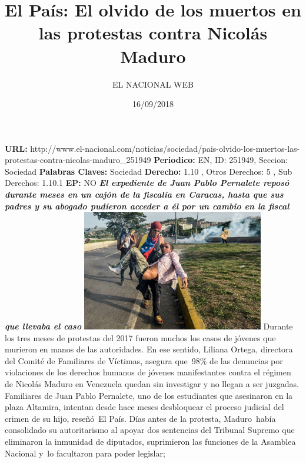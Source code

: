 \documentclass{article}%
\title{\textbf{El País: El olvido de los muertos en las protestas contra Nicolás Maduro}}%
\author{EL NACIONAL WEB}%
\date{16/09/2018}%
\begin{document}
%
\normalsize%
\maketitle%
\textbf{URL: }%
http://www.el{-}nacional.com/noticias/sociedad/pais{-}olvido{-}los{-}muertos{-}las{-}protestas{-}contra{-}nicolas{-}maduro\_251949\newline%
%
\textbf{Periodico: }%
EN, %
ID: %
251949, %
Seccion: %
Sociedad\newline%
%
\textbf{Palabras Claves: }%
Sociedad\newline%
%
\textbf{Derecho: }%
1.10%
, Otros Derechos: %
5%
, Sub Derechos: %
1.10.1%
\newline%
%
\textbf{EP: }%
NO\newline%
\newline%
%
\textbf{\textit{El expediente de Juan Pablo Pernalete reposó durante meses en un cajón de la fiscalía en Caracas, hasta que sus padres y su abogado pudieron acceder a él por un cambio en la fiscal que llevaba el caso}}%
\newline%
\newline%
%
\includegraphics[width=300px]{64.jpg}%
\newline%
%
Durante los tres meses de protestas del 2017 fueron muchos los casos de jóvenes que murieron en manos de las autoridades. En ese sentido, Liliana Ortega, directora del Comité de Familiares de Víctimas, asegura que~98\% de las denuncias por violaciones de los derechos humanos de jóvenes manifestantes contra el régimen de Nicolás Maduro en Venezuela quedan sin investigar y no llegan a ser juzgadas.%
\newline%
%
Familiares de Juan Pablo Pernalete, uno de los estudiantes que asesinaron en la plaza Altamira, intentan desde hace meses desbloquear el proceso judicial del crimen de su hijo, reseñó~El País.%
\newline%
%
Días antes de la protesta, Maduro~había consolidado su autoritarismo al apoyar dos sentencias del Tribunal Supremo que eliminaron la inmunidad de diputados, suprimieron las funciones de la Asamblea Nacional y~lo facultaron para poder legislar;%
\end{document}
